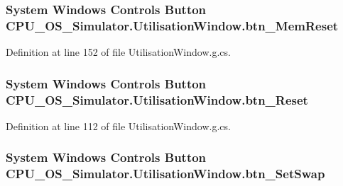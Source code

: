 \subsubsection[{btn\+\_\+\+Mem\+Reset}]{\setlength{\rightskip}{0pt plus 5cm}System Windows Controls Button C\+P\+U\+\_\+\+O\+S\+\_\+\+Simulator.\+Utilisation\+Window.\+btn\+\_\+\+Mem\+Reset\hspace{0.3cm}{\ttfamily [package]}}\label{class_c_p_u___o_s___simulator_1_1_utilisation_window_adb923d9d563899c198d1dba63d5adb4b}


Definition at line 152 of file Utilisation\+Window.\+g.\+cs.

\hypertarget{class_c_p_u___o_s___simulator_1_1_utilisation_window_a16d001bbb7b42530a56397f3339e3704}{}
\subsubsection[{btn\+\_\+\+Reset}]{\setlength{\rightskip}{0pt plus 5cm}System Windows Controls Button C\+P\+U\+\_\+\+O\+S\+\_\+\+Simulator.\+Utilisation\+Window.\+btn\+\_\+\+Reset\hspace{0.3cm}{\ttfamily [package]}}\label{class_c_p_u___o_s___simulator_1_1_utilisation_window_a16d001bbb7b42530a56397f3339e3704}


Definition at line 112 of file Utilisation\+Window.\+g.\+cs.

\hypertarget{class_c_p_u___o_s___simulator_1_1_utilisation_window_aa30361a85b16eec362b962731232111a}{}
\subsubsection[{btn\+\_\+\+Set\+Swap}]{\setlength{\rightskip}{0pt plus 5cm}System Windows Controls Button C\+P\+U\+\_\+\+O\+S\+\_\+\+Simulator.\+Utilisation\+Window.\+btn\+\_\+\+Set\+Swap\hspace{0.3cm}{\ttfamily [package]}}\label{class_c_p_u___o_s___simulator_1_1_utilisation_window_aa30361a85b16eec362b962731232111a}


